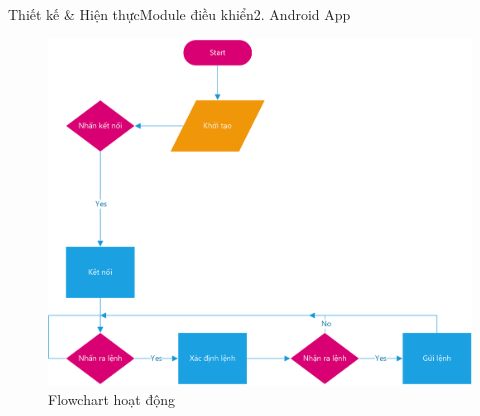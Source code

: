 \documentclass[compress, blue, 13pt,hyperref={pdfpagemode=FullScreen}]{beamer}
\begin{document}
\begin{frame}{Thiết kế \& Hiện thực}{Module điều khiển}{2. Android App}
\transblindshorizontal
\begin{figure}[hbtp]
\centering
\includegraphics[scale=0.45]{images/flowchart_app.png}
\caption{Flowchart hoạt động}
\end{figure}
\end{frame}
\end{document}
